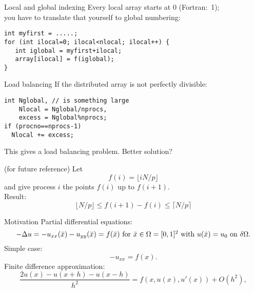 \begin{numberedframe}{Local and global indexing}
  Every local array starts at 0 (Fortran:~1);\\
  you have to translate that yourself to global numbering:
\lstset{language=C}
\begin{lstlisting}
int myfirst = .....;
for (int ilocal=0; ilocal<nlocal; ilocal++) {
   int iglobal = myfirst+ilocal;
   array[ilocal] = f(iglobal);
}  
\end{lstlisting}
\end{numberedframe}

\begin{optexerciseframe}
  
\end{optexerciseframe}

\begin{numberedframe}{Load balancing}
If the distributed array is not perfectly divisible:
\lstset{language=C}
\begin{lstlisting}
int Nglobal, // is something large
    Nlocal = Nglobal/nprocs,
    excess = Nglobal%nprocs;
if (procno==nprocs-1) 
  Nlocal += excess;
\end{lstlisting}
This gives a load balancing problem. Better solution?
\end{numberedframe}

\begin{numberedframe}{(for future reference)}
Let
\[ f(i)=\lfloor iN/p\rfloor \]
and give process $i$ the points $f(i)$ up to $f(i+1)$. \\
Result:
\[ \lfloor N/p\rfloor \leq f(i+1)-f(i)\leq \lceil N/p\rceil \]
\end{numberedframe}


\begin{numberedframe}{Motivation}
  Partial differential equations:
  \[
    \hbox{$-\Delta u = -u_{xx}(\bar x)-u_{yy}(\bar x)=f(\bar x)$ for
      $\bar x\in\Omega=[0,1]^2$ 
      with $u(\bar x)=u_0$ on $\delta\Omega$.}
    \]
  Simple case:
  \[ -u_{xx}=f(x). \]
  Finite difference approximation:
  \[ \frac{2u(x)-u(x+h)-u(x-h)}{h^2}=f(x,u(x),u'(x))+O(h^2), \]
\end{numberedframe}

